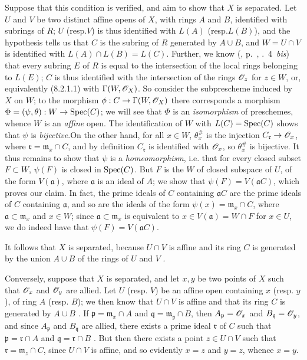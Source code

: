 \documentclass[10pt,oneside]{book}
\begin{document}
Suppose that this condition is verified, and aim to show that $X$ is separated.
Let $U$ and $V$ be two distinct affine opens of $X$, with rings $A$ and $B$,
identified with subrings of $R$; $U$ (resp.$V$) is thus identified 
with $L(A)$ (resp.$L(B)$), and the hypothesis tells us  that $C$ is
the subring of $R$ generated by $A\cup B$, and $W=U\cap V$ is identified with
$L(A)\cap L(B)=L(C)$. Further, we know
(\cite{1}, p.~, .~4~\emph{bis}) that every subring $E$ of $R$ is
equal to the intersection of the local rings belonging to $L(E)$; $C$ is thus
identified with the intersection of the rings $\mathscr{O}_z$ for $z\in W$, or,
equivalently (8.2.1.1) with $\Gamma(W,\mathscr{O}_X)$. So consider the subprescheme
induced by $X$ on $W$; to the  morphism $\phi:
C\to\Gamma(W,\mathscr{O}_X)$ there corresponds  a morphism
$\Phi=(\psi,\theta):W\to{\mathop{\mathrm{Spec}}\nolimits}(C)$; we will see that $\Phi$ is an
\emph{isomorphism} of preschemes, whence $W$ is an \emph{affine} open. The
identification of $W$ with $L(C)={\mathop{\mathrm{Spec}}\nolimits}(C)$ shows that $\psi$ is
\emph{bijective}.On the other hand, for all $x\in W$, $\theta_x^\#$ is the
injection $C_\mathfrak{r}\to\mathscr{O}_x$, where $\mathfrak{r}=\mathfrak{m}_x\cap C$,
and by definition $C_\mathfrak{r}$ is identified with $\mathscr{O}_x$, so $\theta_x^\#$
is bijective. It thus remains to show that $\psi$ is a \emph{homeomorphism},
i.e. that for every closed subset $F\subset W$, $\psi(F)$ is closed in
${\mathop{\mathrm{Spec}}\nolimits}(C)$. But $F$ is the  $W$ of closed subspace of $U$,
of the form $V(\mathfrak{a})$, where $\mathfrak{a}$ is an ideal of $A$; we show
that $\psi(F)=V(\mathfrak{a}C)$, which proves our claim. In fact, the prime
ideals of $C$ containing $\mathfrak{a}C$ are the prime ideals of $C$ containing
$\mathfrak{a}$, and so are the ideals of the form $\psi(x)=\mathfrak{m}_x\cap
C$, where $\mathfrak{a}\subset\mathfrak{m}_x$ and $x\in W$; since
$\mathfrak{a}\subset\mathfrak{m}_x$ is equivalent to $x\in V(\mathfrak{a})=W\cap
F$ for $x\in U$, we do indeed have that $\psi(F)=V(\mathfrak{a}C)$.

It follows that $X$ is separated, because $U\cap V$ is affine and its ring $C$
is generated by the union $A\cup B$ of the rings of $U$ and $V$ .

Conversely, suppose that $X$ is separated, and let $x,y$ be two points of $X$
such that $\mathscr{O}_x$ and $\mathscr{O}_y$ are allied. Let $U$ (resp. $V$) be an affine open
containing $x$ (resp. $y$), of ring $A$ (resp. $B$); we then know that $U\cap V$
is affine and that its ring $C$ is generated by $A\cup B$ . If
$\mathfrak{p}=\mathfrak{m}_x\cap A$ and $\mathfrak{q}=\mathfrak{m}_y\cap B$,
then $A_\mathfrak{p}=\mathscr{O}_x$ and $B_\mathfrak{q}=\mathscr{O}_y$, and since $A_\mathfrak{p}$
and $B_\mathfrak{q}$ are allied, there exists a prime ideal $\mathfrak{r}$ of
$C$ such that $\mathfrak{p}=\mathfrak{r}\cap A$ and
$\mathfrak{q}=\mathfrak{r}\cap B$ . But then there exists a point
$z\in U\cap V$ such that $\mathfrak{r}=\mathfrak{m}_z\cap C$, since $U\cap V$ is
affine, and so evidently $x=z$ and $y=z$, whence $x=y$.
\end{document}
